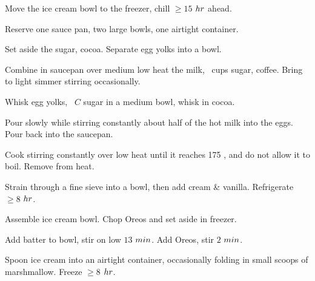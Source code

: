 \begin{preparation}
\item Move the ice cream bowl to the freezer, chill $\ge15$ $\hour$ ahead.

\item Reserve one sauce pan, two large bowls, one airtight container.

\item Set aside the sugar, cocoa.
    Separate egg yolks into a bowl.

\item Combine in saucepan over medium low heat the milk, \onehalf~cups sugar, coffee.
    Bring to light simmer stirring occasionally.

\item Whisk egg yolks, \onefourth~$C$ sugar in a medium bowl, whisk in cocoa.

\item Pour slowly while stirring constantly about half of the hot milk into the eggs.
    Pour back into the saucepan.

\item Cook stirring constantly over low heat until it reaches 175 \Fahrenheit, and do not allow it to boil.
    Remove from heat.

\item Strain through a fine sieve into a bowl, then add cream \& vanilla.
    Refrigerate $\ge8$ $\hour$.

\item Assemble ice cream bowl.
    Chop Oreos and set aside in freezer.

\item Add batter to bowl, stir on low $13$ $\minute$.
    Add Oreos, stir $2$ $\minute$.

\item Spoon ice cream into an airtight container, occasionally folding in small scoops of marshmallow.
    Freeze $\ge8$ $\hour$.
\end{preparation}

\recipeend%

